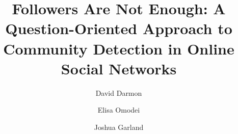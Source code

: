 \documentclass{article}
\begin{document}
\title{Followers Are Not Enough: A Question-Oriented Approach to Community Detection in Online Social Networks}


 \author[1]{David Darmon}
 \author[2]{Elisa Omodei}
 \author[3]{Joshua Garland}



\maketitle


 
 
 
 

 

\maketitle
\end{document}
